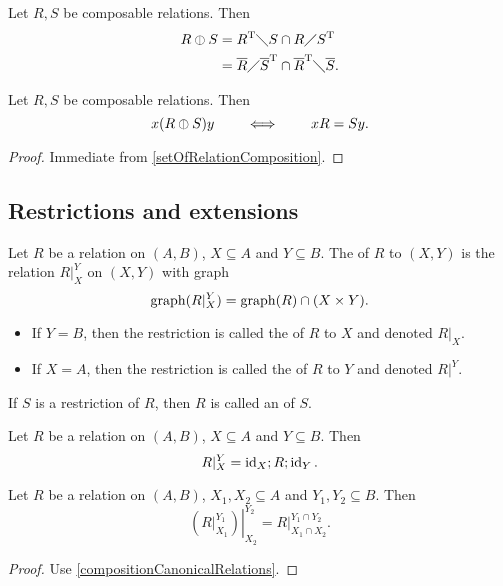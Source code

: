 \begin{lemma}
Let $R,S$ be composable relations. Then
\begin{align*}
R\mathbin{\obar} S &= R^{\mathrm{T}}\diagdown S \cap R\diagup S^{\mathrm{T}} \\
&= \overline{R}\diagup \overline{S}^{\mathrm{T}} \cap \overline{R}^{\mathrm{T}} \diagdown \overline{S}.
\end{align*}
\end{lemma}

\begin{lemma}
Let $R,S$ be composable relations. Then
\[ x(R\mathbin{\obar} S)y \qquad\iff\qquad xR = Sy. \]
\end{lemma}
\begin{proof}
Immediate from \ref{setOfRelationComposition}.
\end{proof}

\subsection{Restrictions and extensions}
\begin{definition}
Let $R$ be a relation on $(A, B)$, $X\subseteq A$ and $Y \subseteq B$. The  of $R$ to $(X,Y)$ is the relation $R|^Y_X$ on $(X,Y)$ with graph
\[ \operatorname{graph}(R|^Y_X) = \operatorname{graph}(R)\cap (X\times Y). \]
\begin{itemize}
\item If $Y = B$, then the restriction is called the  of $R$ to $X$ and denoted $\left.R\right|_X$.
\item If $X = A$, then the restriction is called the  of $R$ to $Y$ and denoted $\left.R\right|^Y$.
\end{itemize}
If $S$ is a restriction of $R$, then $R$ is called an  of $S$.
\end{definition}

\begin{lemma}
Let $R$ be a relation on $(A, B)$, $X\subseteq A$ and $Y \subseteq B$. Then
\[ R|^Y_X = \operatorname{id}_X;R;\operatorname{id}_Y. \]
\end{lemma}
\begin{corollary}
Let $R$ be a relation on $(A, B)$, $X_1,X_2\subseteq A$ and $Y_1,Y_2 \subseteq B$. Then
\[ \left.\left(R|_{X_1}^{Y_1}\right)\right|_{X_2}^{Y_2} = R|_{X_1\cap X_2}^{Y_1\cap Y_2}. \]
\end{corollary}
\begin{proof}
Use \ref{compositionCanonicalRelations}.
\end{proof} 

